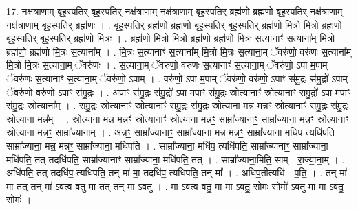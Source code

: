 \documentclass[17pt]{extarticle}
\begin{document}
17. नक्ष॑त्राणा॒म् बृह॒स्पति॒र् बृह॒स्पति॒र् नक्ष॑त्राणा॒म् नक्ष॑त्राणा॒म् बृह॒स्पति॒र् ब्रह्म॑णो॒ ब्रह्म॑णो॒ बृह॒स्पति॒र् नक्ष॑त्राणा॒म् नक्ष॑त्राणा॒म् बृह॒स्पति॒र् ब्रह्म॑णः । . बृह॒स्पति॒र् ब्रह्म॑णो॒ ब्रह्म॑णो॒ बृह॒स्पति॒र् बृह॒स्पति॒र् ब्रह्म॑णो मि॒त्रो मि॒त्रो ब्रह्म॑णो॒ बृह॒स्पति॒र् बृह॒स्पति॒र् ब्रह्म॑णो मि॒त्रः । . ब्रह्म॑णो मि॒त्रो मि॒त्रो ब्रह्म॑णो॒ ब्रह्म॑णो मि॒त्रः स॒त्यानाꣳ॑ स॒त्याना᳚म् मि॒त्रो ब्रह्म॑णो॒ ब्रह्म॑णो मि॒त्रः स॒त्याना᳚म् । . मि॒त्रः स॒त्यानाꣳ॑ स॒त्याना᳚म् मि॒त्रो मि॒त्रः स॒त्याना॒म् ॅवरु॑णो॒ वरु॑णः स॒त्याना᳚म् मि॒त्रो मि॒त्रः स॒त्याना॒म् ॅवरु॑णः । . स॒त्याना॒म् ॅवरु॑णो॒ वरु॑णः स॒त्यानाꣳ॑ स॒त्याना॒म् ॅवरु॑णो॒ ऽपा म॒पाम् ॅवरु॑णः स॒त्यानाꣳ॑ स॒त्याना॒म् ॅवरु॑णो॒ ऽपाम् । . वरु॑णो॒ ऽपा म॒पाम् ॅवरु॑णो॒ वरु॑णो॒ ऽपाꣳ स॑मु॒द्रः स॑मु॒द्रो॑ ऽपाम् ॅवरु॑णो॒ वरु॑णो॒ ऽपाꣳ स॑मु॒द्रः । . अ॒पाꣳ स॑मु॒द्रः स॑मु॒द्रो॑ ऽपा म॒पाꣳ स॑मु॒द्रः स्रो॒त्यानाꣳ॑ स्रो॒त्यानाꣳ॑ समु॒द्रो॑ ऽपा म॒पाꣳ 
स॑मु॒द्रः स्रो॒त्याना᳚म् । . स॒मु॒द्रः स्रो॒त्यानाꣳ॑ स्रो॒त्यानाꣳ॑ समु॒द्रः स॑मु॒द्रः स्रो॒त्याना॒ मन्न॒ मन्नꣳ॑ स्रो॒त्यानाꣳ॑ समु॒द्रः स॑मु॒द्रः स्रो॒त्याना॒ मन्न᳚म् । . स्रो॒त्याना॒ मन्न॒ मन्नꣳ॑ स्रो॒त्यानाꣳ॑ स्रो॒त्याना॒ मन्नꣳ॒॒ साम्रा᳚ज्यानाꣳ॒॒ साम्रा᳚ज्याना॒ मन्नꣳ॑ स्रो॒त्यानाꣳ॑ स्रो॒त्याना॒ मन्नꣳ॒॒ साम्रा᳚ज्यानाम् । . अन्नꣳ॒॒ साम्रा᳚ज्यानाꣳ॒॒ साम्रा᳚ज्याना॒ मन्न॒ मन्नꣳ॒॒ साम्रा᳚ज्याना॒ मधि॑प॒ त्यधि॑पति॒ साम्रा᳚ज्याना॒ मन्न॒ मन्नꣳ॒॒ साम्रा᳚ज्याना॒ मधि॑पति । . साम्रा᳚ज्याना॒ मधि॑प॒ त्यधि॑पति॒ साम्रा᳚ज्यानाꣳ॒॒ साम्रा᳚ज्याना॒ मधि॑पति॒ तत् तदधि॑पति॒ साम्रा᳚ज्यानाꣳ॒॒ साम्रा᳚ज्याना॒ मधि॑पति॒ तत् । . साम्रा᳚ज्याना॒मिति॒ साम् - रा॒ज्या॒ना॒म् । . अधि॑पति॒ तत् तदधि॑प॒ त्यधि॑पति॒ तन् मा॑ मा॒ तदधि॑प॒ त्यधि॑पति॒ तन् मा᳚ । . अधि॑प॒तीत्यधि॑ - प॒ति॒ । . तन् मा॑ मा॒ तत् तन् मा॑ ऽवत्व वतु मा॒ तत् तन् मा॑ ऽवतु । . मा॒ ऽव॒त्व॒ व॒तु॒ मा॒ मा॒ ऽव॒तु॒ सोमः॒ सोमो॑ ऽवतु मा मा ऽवतु॒ सोमः॑ । \newline
\end{document}

